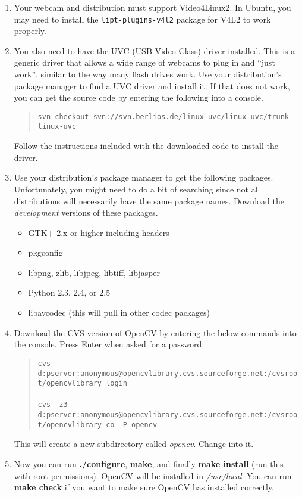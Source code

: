 \documentclass {article}
\begin{document}
\begin {enumerate}
  \item Your webcam and distribution must support Video4Linux2.  In Ubuntu, you may need to install
        the {\tt lipt-plugins-v4l2} package for V4L2 to work properly.
  \item You also need to have the UVC (USB Video Class) driver installed.  This is a generic driver
        that allows a wide range of webcams to plug in and ``just work'', similar to the way many
        flash drives work.  Use your distribution's package manager to find a UVC driver and install
        it.  If that does not work, you can get the source code by entering the following into a console.
        \begin {quote}
          {\tt svn checkout svn://svn.berlios.de/linux-uvc/linux-uvc/trunk linux-uvc}
        \end {quote}
        Follow the instructions included with the downloaded code to install the driver.
  \item Use your distribution's package manager to get the following packages.  Unfortunately, you
        might need to do a bit of searching since not all distributions will necessarily have the same
        package names.  Download the {\em development} versions of these packages.
        \begin {itemize}
          \item GTK+ 2.x or higher including headers
          \item pkgconfig
          \item libpng, zlib, libjpeg, libtiff, libjasper
          \item Python 2.3, 2.4, or 2.5
          \item libavcodec (this will pull in other codec packages)
        \end {itemize}
  \item Download the CVS version of OpenCV by entering the below commands into the console.  Press Enter
        when asked for a password.
        \begin {quote}
          {\tt cvs -d:pserver:anonymous@opencvlibrary.cvs.sourceforge.net:/cvsroot/opencvlibrary
            login}\\ \\ 
          {\tt cvs -z3 -d:pserver:anonymous@opencvlibrary.cvs.sourceforge.net:/cvsroot/opencvlibrary
            co -P opencv}
        \end {quote}
        This will create a new subdirectory called {\it opencv}.  Change into it.
  \item Now you can run {\bf ./configure}, {\bf make}, and finally {\bf make install} (run this with
        root permissions).  OpenCV will be installed in {\it /usr/local}.  You can run {\bf make
          check} if you want to make sure OpenCV has installed correctly.
\end {enumerate}
\end{document}
